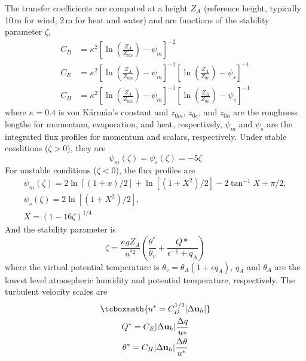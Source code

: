 \documentclass[a4paper,11pt]{article}
\begin{document}
The transfer coefficients are computed at a height $Z_A$ (reference height, typically 10\,m for wind, 2\,m for heat and water) and are functions of the stability parameter $\zeta$,
\begin{align}
C_D &= \kappa^2\left[\ln\left(\frac{Z_A}{Z_{0m}}\right) - \psi_m\right]^{-2} \\
C_E &= \kappa^2\left[\ln\left(\frac{Z_A}{Z_{0m}}\right) - \psi_m\right]^{-1} 
			 \left[\ln\left(\frac{Z_A}{Z_{0e}}\right) - \psi_s\right]^{-1} \\
C_H &= \kappa^2\left[\ln\left(\frac{Z_A}{Z_{0m}}\right) - \psi_m\right]^{-1} 
			 \left[\ln\left(\frac{Z_A}{Z_{0h}}\right) - \psi_s\right]^{-1}			 
\end{align}
where $\kappa=0.4$ is von K\'arm\'an's constant and $z_{0m}$, $z_{0e}$, and $z_{0h}$ are the roughness lengths for momentum, evaporation, and heat, respectively, $\psi_m$ and $\psi_s$ are the integrated flux profiles for momentum and scalars, respectively.
Under stable conditions ($\zeta>0$), they are
\begin{equation}
\psi_m(\zeta) = \psi_s(\zeta) = -5\zeta
\end{equation}
For unstable conditions ($\zeta<0$), the flux profiles are
\begin{gather}
\psi_m(\zeta) = 2\ln[(1+x)/2] + \ln[(1+X^2)/2] - 2\tan^{-1}X + \pi/2,\\ 
\psi_s(\zeta) = 2\ln[(1+X^2)/2],\\
X = (1-16\zeta)^{1/4}
\end{gather} 
And the stability parameter is 
\begin{equation}
\zeta = \frac{\kappa g Z_A}{u^{*2}}\left(\frac{\theta^*}{\theta_v} + \frac{Q*}{\epsilon^{-1}+q_A}\right)
\end{equation}
where the virtual potential temperature is $\theta_v=\theta_A(1+\epsilon q_A)$, $q_A$ and $\theta_A$ are the lowest level atmospheric humidity and potential temperature, respectively. The turbulent velocity scales are
\begin{gather}
\tcboxmath{u^* = C_D^{1/2} | \Delta \mathbf{u}_h |}\\
Q^* = C_E |\Delta\mathbf{u}_h| \frac{\Delta q}{u*}\\
\theta^* = C_H |\Delta\mathbf{u}_h| \frac{\Delta \theta}{u^*}
\end{gather}
\end{document}
